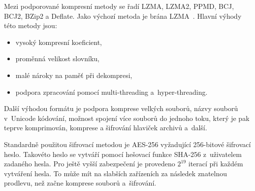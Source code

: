  Mezi podporované kompresní metody se řadí LZMA, LZMA2, PPMD, BCJ, BCJ2, BZip2 a
Deflate. Jako výchozí metoda je brána LZMA~\cite{7z:2015}. Hlavní výhody této metody jsou:
\begin{itemize}
    \item vysoký kompresní koeficient,
    \item proměnná velikost slovníku,
    \item malé nároky na paměť při dekompresi,
    \item podpora zpracování pomocí multi-threading a~hyper-threading.
\end{itemize}
Další výhodou formátu je podpora komprese velkých souborů, názvy souborů v~Unicode
kódování, možnost spojení více souborů do jednoho toku, který je pak teprve komprimován, komprese
a šifrování hlaviček archivů a~další.

 Standardně použitou šifrovací metodou je AES-256 vyžadující 256-bitové šifrovací heslo.
Takovéto heslo se vytváří pomocí hešovací funkce SHA-256 z~uživatelem zadaného hesla. Pro ještě
vyšší zabezpečení je provedeno \(2^{19}\) iterací při každém vytváření hesla. To může mít na
slabších zařízeních za následek znatelnou prodlevu, než začne komprese souborů a~šifrování.

